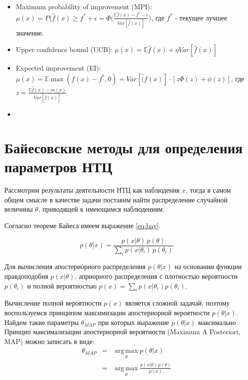 \begin{itemize}
\item Maximum probability of improvement (MPI): $ \mu \left( x \right) = P(\hat{ f} \left( x  \right) \geq f^* + \epsilon =  \Phi \bigg( \frac{\mathbb{E}\hat{ f} \left( x  \right) - f^* -\epsilon}{Var[\hat{ f } \left( x  \right)]}\bigg) $, где $f^*$ - текущее лучшее значение.
\item Upper confidence bound (UCB): $  \mu \left(   x \right) = \mathbb{E}\hat{ f } \left( x  \right) + \eta Var[\hat{ f} \left( x  \right)] $
\item Expected improvement (EI): $  \mu \left(   x \right) = \mathbb{E} \max( f \left( x  \right) - f^*,0)  = Var[\hat( f \left( x  \right)] \cdot [z \Phi (z) + \phi(z)]$, где $z = \frac{\mathbb{E}\hat{ f }\left( x  \right) - m\left( x \right)}{Var[\hat{ f } \left( x  \right)]}$
\item 
\end{itemize}

\section {Байесовские методы для определения параметров НТЦ}

Рассмотрим результаты деятельности НТЦ как наблюдения $x$, тогда в самом общем смысле в качестве задачи поставим найти распределение случайной величины $\theta$, приводящей к имеющимся наблюдениям.

Согласно теореме Байеса имеем выражение \ref{eq:bay}.

\begin{equation} \label{eq:bay}
p \left(  \theta \vert x \right) = \frac{p \left ( x \vert \theta \right) \, p \left(  \theta \right)} {\sum_i p \left(  x \vert \theta_i \right) \, p \left(  \theta_i \right)}
\end{equation}

Для вычисления апостериорного распределения $p \left(  \theta \vert x \right)$ на основании функции правдоподобия $p \left ( x \vert \theta \right)$, априорного распределения с плотностью вероятности $p \left(  \theta_i \right)$ и полной вероятностью $p \left(  x \right) = \sum_i  p \left(  x \vert \theta_i \right) p \left(  \theta_i \right)$. 

Вычисление полной вероятности $p \left(  x \right)$ является сложной задачай, поэтому воспользуемся принципом максимизации апостериорной вероятности $p \left( \theta \vert  x \right)$. Найдем такие параметры $\theta_{MAP}$ при которых выражение $p \left( \theta \vert  x \right)$ максимально. Принцип максимализации апостериорной вероятности (Maximum A Posteriori, MAP) можно записать в виде: 
\begin{eqnarray*} 
\theta_{MAP} & = & \operatorname*{arg\,max}_\theta p \left( \theta \vert  x \right)\\
			 & = & \operatorname*{arg\,max}_\theta \frac{p \left( x \vert \theta \right) \, p \left( \theta \right)} {p \left(  x \right)}
\end{eqnarray*}

